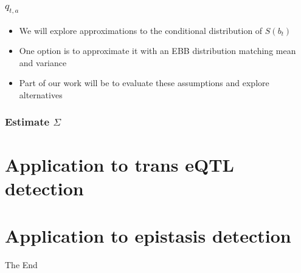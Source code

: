 \documentclass{beamer}
\begin{document}
\begin{frame}
\frametitle{$q_{t,a}$}
\begin{itemize}
\item We will explore approximations to the conditional distribution of $S(b_t)$
\item One option is to approximate it with an EBB distribution matching mean and variance
\item Part of our work will be to evaluate these assumptions and explore alternatives
\end{itemize}
\end{frame}

\begin{frame}
\frametitle{Estimate $\Sigma$}

\section{Application to trans eQTL detection}

\section{Application to epistasis detection}

\end{frame}



\begin{comment}
\begin{frame}
\frametitle{References}
\footnotesize{
\begin{thebibliography}{99} %
\bibitem[Smith, 2012]{p1} John Smith (2012)
\newblock Title of the publication
\newblock \emph{Journal Name} 12(3), 45 -- 678.
\end{thebibliography}
}
\end{frame}
\end{comment}


\begin{frame}
\Huge{\centerline{The End}}
\end{frame}

\end{document}
